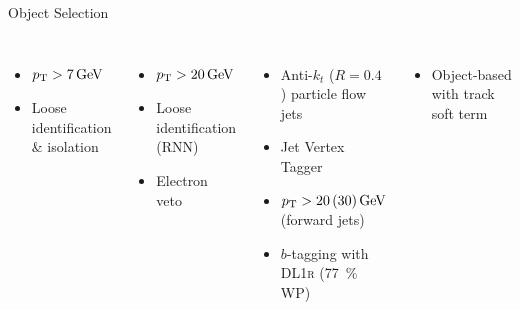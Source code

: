 \documentclass[11pt, xcolor={dvipsnames}, aspectratio=169, notes]{beamer}
\begin{document}
\begin{frame}{Object Selection}
  \begin{columns}[onlytextwidth]

    \begin{itemize}
    \item $\pT > \SI{7}{\GeV}$
    \item Loose identification \& isolation
    \end{itemize}

    \vspace*{1em}

    \allbold{\tauhadvis:}
    \begin{itemize}
    \item $\pT > \SI{20}{\GeV}$
    \item Loose identification (RNN)
    \item Electron veto
    \end{itemize}




    \begin{itemize}
    \item Anti-$k_{t}$ ($R = 0.4$) particle flow jets
    \item Jet Vertex Tagger
    \item $\pT > \num{20} \, (\num{30})\,\si{\GeV}$ (forward jets)
    \item $b$-tagging with \textsc{DL1r} (\SI{77}{\percent} WP)
    \end{itemize}

    \vspace*{1em}

    \allbold{\pTmissAbs:}
    \begin{itemize}
    \item Object-based with track soft term
    \end{itemize}
  \end{columns}

\end{frame}
\end{document}
